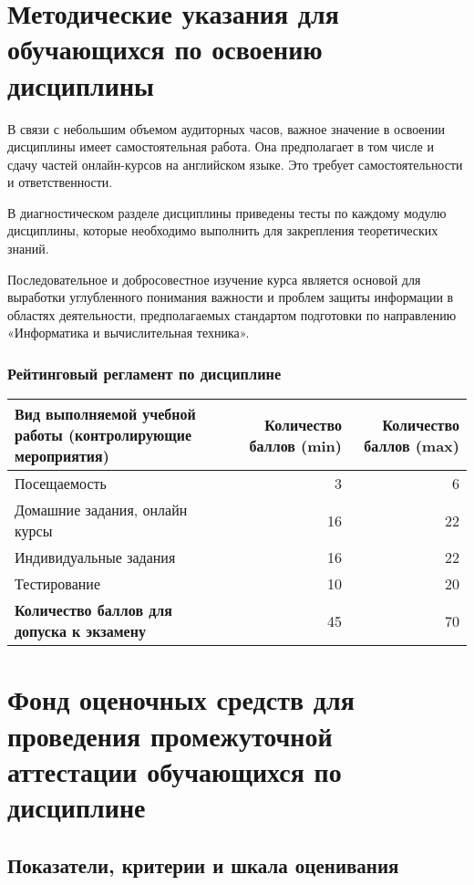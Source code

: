 \documentclass[a4paper,12pt]{article}
\begin{document}
\section{Методические указания для обучающихся по освоению дисциплины}
В связи с небольшим объемом аудиторных часов, важное значение в освоении
дисциплины имеет самостоятельная работа. Она предполагает в том числе
и сдачу частей онлайн-курсов на английском языке. Это
требует самостоятельности и ответственности.
\par
В диагностическом разделе дисциплины приведены тесты по каждому модулю
дисциплины, которые необходимо выполнить для закрепления теоретических
знаний.
\par
Последовательное и добросовестное изучение курса является основой для
выработки углубленного понимания важности и проблем защиты информации
в областях деятельности, предполагаемых стандартом подготовки по направлению
«Информатика и вычислительная техника».



\subsubsection*{Рейтинговый регламент по дисциплине}
\begin{longtable}{|>{\raggedright\arraybackslash}p{110mm}|r|r|}
\hline
\centering\arraybackslash Вид выполняемой учебной работы (контролирующие мероприятия) & 
\multicolumn{1}{p{20mm}|}{\centering\arraybackslash Количество баллов (min)} & 
\multicolumn{1}{p{20mm}|}{\centering\arraybackslash Количество баллов (max)} \\
\hline
Посещаемость & 3 & 6 \\ 
\hline
Домашние задания, онлайн курсы & 16 & 22 \\ 
\hline
Индивидуальные задания & 16 & 22 \\ 
\hline
Тестирование & 10 & 20 \\ 
\hline
{\bf Количество баллов для допуска к экзамену} & 45 & 70 \\ 

\hline
\end{longtable}

\section{Фонд оценочных средств для проведения промежуточной аттестации обучающихся по дисциплине}

\subsection{Показатели, критерии и шкала оценивания}
\end{document}
